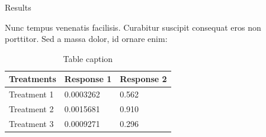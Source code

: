 \documentclass[final]{beamer}
\newlength{\sepwid}
\newlength{\onecolwid}
\newlength{\twocolwid}
\begin{document}
\begin{frame}[t]
\begin{columns}[t]
\begin{column}{\twocolwid}
\begin{columns}[t,totalwidth=\twocolwid]
\begin{column}{\onecolwid}

\end{column} %

\begin{column}{\onecolwid} %


\begin{block}{Results}


Nunc tempus venenatis facilisis. Curabitur suscipit consequat eros non porttitor. Sed a massa dolor, id ornare enim:

\begin{table}
\vspace{2ex}
\begin{tabular}{l l l}
\toprule
\textbf{Treatments} & \textbf{Response 1} & \textbf{Response 2}\\
\midrule
Treatment 1 & 0.0003262 & 0.562 \\
Treatment 2 & 0.0015681 & 0.910 \\
Treatment 3 & 0.0009271 & 0.296 \\
\bottomrule
\end{tabular}
\caption{Table caption}
\end{table}

\end{block}


\end{column} %

\end{columns} %

\end{column} %

\begin{column}{\sepwid}\end{column} %

\begin{column}{\onecolwid} %


\end{column}
\end{columns}
\end{frame}
\end{document}
